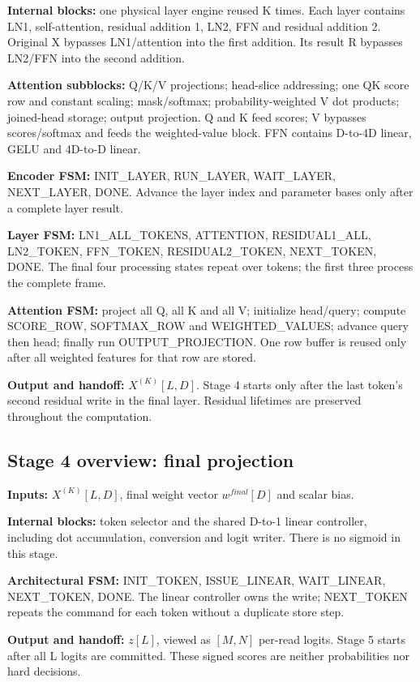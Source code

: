 \documentclass[11pt,a4paper]{article}
\begin{document}
\textbf{Internal blocks:} one physical layer engine reused K times. Each layer contains LN1, self-attention, residual addition 1, LN2, FFN and residual addition 2. Original X bypasses LN1/attention into the first addition. Its result R bypasses LN2/FFN into the second addition.

\textbf{Attention subblocks:} Q/K/V projections; head-slice addressing; one QK score row and constant scaling; mask/softmax; probability-weighted V dot products; joined-head storage; output projection. Q and K feed scores; V bypasses scores/softmax and feeds the weighted-value block. FFN contains D-to-4D linear, GELU and 4D-to-D linear.

\textbf{Encoder FSM:} INIT\_LAYER, RUN\_LAYER, WAIT\_LAYER, NEXT\_LAYER, DONE. Advance the layer index and parameter bases only after a complete layer result.

\textbf{Layer FSM:} LN1\_ALL\_TOKENS, ATTENTION, RESIDUAL1\_ALL, LN2\_TOKEN, FFN\_TOKEN, RESIDUAL2\_TOKEN, NEXT\_TOKEN, DONE. The final four processing states repeat over tokens; the first three process the complete frame.

\textbf{Attention FSM:} project all Q, all K and all V; initialize head/query; compute SCORE\_ROW, SOFTMAX\_ROW and WEIGHTED\_VALUES; advance query then head; finally run OUTPUT\_PROJECTION. One row buffer is reused only after all weighted features for that row are stored.

\textbf{Output and handoff:} $X^{(K)}[L,D]$. Stage 4 starts only after the last token's second residual write in the final layer. Residual lifetimes are preserved throughout the computation.

\subsection{Stage 4 overview: final projection}
\textbf{Inputs:} $X^{(K)}[L,D]$, final weight vector $w^{final}[D]$ and scalar bias.

\textbf{Internal blocks:} token selector and the shared D-to-1 linear controller, including dot accumulation, conversion and logit writer. There is no sigmoid in this stage.

\textbf{Architectural FSM:} INIT\_TOKEN, ISSUE\_LINEAR, WAIT\_LINEAR, NEXT\_TOKEN, DONE. The linear controller owns the write; NEXT\_TOKEN repeats the command for each token without a duplicate store step.

\textbf{Output and handoff:} $z[L]$, viewed as $[M,N]$ per-read logits. Stage 5 starts after all L logits are committed. These signed scores are neither probabilities nor hard decisions.
\end{document}
